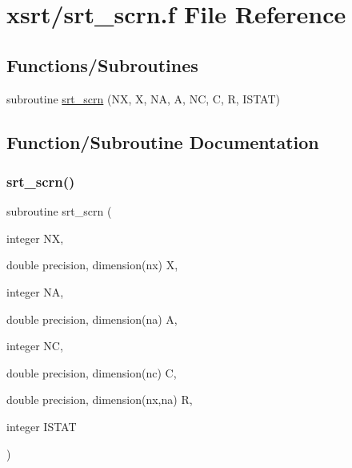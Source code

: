 \hypertarget{srt__scrn_8f}{}\section{xsrt/srt\+\_\+scrn.f File Reference}
\label{srt__scrn_8f}
\subsection*{Functions/\+Subroutines}
\begin{DoxyCompactItemize}
\item 
subroutine \hyperlink{srt__scrn_8f_a4e35b28787a20970c9e46c1e16efa59d}{srt\+\_\+scrn} (NX, X, NA, A, NC, C, R, I\+S\+T\+AT)
\end{DoxyCompactItemize}


\subsection{Function/\+Subroutine Documentation}
\mbox{\label{srt__scrn_8f_a4e35b28787a20970c9e46c1e16efa59d}} 
\subsubsection{\texorpdfstring{srt\+\_\+scrn()}{srt\_scrn()}}
{\footnotesize\ttfamily subroutine srt\+\_\+scrn (\begin{DoxyParamCaption}\item[{integer}]{NX,  }\item[{double precision, dimension(nx)}]{X,  }\item[{integer}]{NA,  }\item[{double precision, dimension(na)}]{A,  }\item[{integer}]{NC,  }\item[{double precision, dimension(nc)}]{C,  }\item[{double precision, dimension(nx,na)}]{R,  }\item[{integer}]{I\+S\+T\+AT }\end{DoxyParamCaption})}

